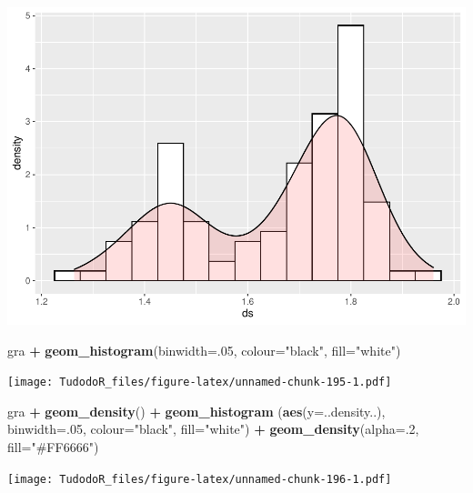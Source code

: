 \documentclass[
]{book}
\newenvironment{Shaded}{\begin{snugshade}}{\end{snugshade}}
\newcommand{\DataTypeTok}[1]{\textcolor[rgb]{0.13,0.29,0.53}{#1}}
\newcommand{\DecValTok}[1]{\textcolor[rgb]{0.00,0.00,0.81}{#1}}
\newcommand{\KeywordTok}[1]{\textcolor[rgb]{0.13,0.29,0.53}{\textbf{#1}}}
\newcommand{\NormalTok}[1]{#1}
\newcommand{\OperatorTok}[1]{\textcolor[rgb]{0.81,0.36,0.00}{\textbf{#1}}}
\newcommand{\StringTok}[1]{\textcolor[rgb]{0.31,0.60,0.02}{#1}}
\begin{document}
\includegraphics{TudodoR_files/figure-latex/unnamed-chunk-194-1.pdf}

\begin{Shaded}
\begin{Highlighting}[]
\NormalTok{gra }\OperatorTok{+}\StringTok{  }\KeywordTok{geom_histogram}\NormalTok{(}\DataTypeTok{binwidth=}\NormalTok{.}\DecValTok{05}\NormalTok{, }\DataTypeTok{colour=}\StringTok{"black"}\NormalTok{, }\DataTypeTok{fill=}\StringTok{"white"}\NormalTok{)}
\end{Highlighting}
\end{Shaded}

\texttt{[image: TudodoR\_files/figure-latex/unnamed-chunk-195-1.pdf]}

\begin{Shaded}
\begin{Highlighting}[]
\NormalTok{gra }\OperatorTok{+}\StringTok{ }\KeywordTok{geom_density}\NormalTok{() }\OperatorTok{+}\StringTok{ }
\StringTok{  }\KeywordTok{geom_histogram}\NormalTok{ (}\KeywordTok{aes}\NormalTok{(}\DataTypeTok{y=}\NormalTok{..density..),              }\DataTypeTok{binwidth=}\NormalTok{.}\DecValTok{05}\NormalTok{,}
    \DataTypeTok{colour=}\StringTok{"black"}\NormalTok{, }\DataTypeTok{fill=}\StringTok{"white"}\NormalTok{) }\OperatorTok{+}
\StringTok{    }\KeywordTok{geom_density}\NormalTok{(}\DataTypeTok{alpha=}\NormalTok{.}\DecValTok{2}\NormalTok{, }\DataTypeTok{fill=}\StringTok{"#FF6666"}\NormalTok{)}
\end{Highlighting}
\end{Shaded}

\texttt{[image: TudodoR\_files/figure-latex/unnamed-chunk-196-1.pdf]}
\end{document}
